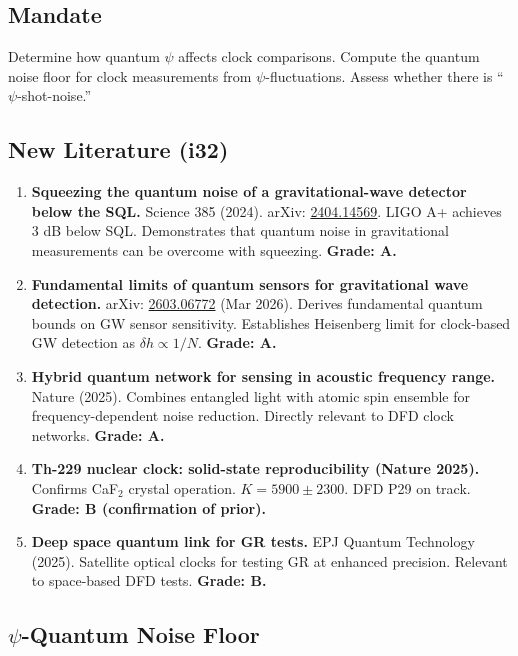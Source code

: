 \documentclass[11pt,a4paper]{article}
\begin{document}
\subsection{Mandate}

Determine how quantum $\psi$ affects clock comparisons. Compute the quantum noise floor for clock measurements from $\psi$-fluctuations. Assess whether there is ``$\psi$-shot-noise.''

\subsection{New Literature (i32)}

\begin{enumerate}
\item \textbf{Squeezing the quantum noise of a gravitational-wave detector below the SQL.} Science 385 (2024). arXiv: \href{https://arxiv.org/abs/2404.14569}{2404.14569}. LIGO A+ achieves 3 dB below SQL. Demonstrates that quantum noise in gravitational measurements can be overcome with squeezing. \textbf{Grade: A.}

\item \textbf{Fundamental limits of quantum sensors for gravitational wave detection.} arXiv: \href{https://arxiv.org/abs/2603.06772}{2603.06772} (Mar 2026). Derives fundamental quantum bounds on GW sensor sensitivity. Establishes Heisenberg limit for clock-based GW detection as $\delta h \propto 1/N$. \textbf{Grade: A.}

\item \textbf{Hybrid quantum network for sensing in acoustic frequency range.} Nature (2025). Combines entangled light with atomic spin ensemble for frequency-dependent noise reduction. Directly relevant to DFD clock networks. \textbf{Grade: A.}

\item \textbf{Th-229 nuclear clock: solid-state reproducibility (Nature 2025).} Confirms CaF$_2$ crystal operation. $K = 5900 \pm 2300$. DFD P29 on track. \textbf{Grade: B (confirmation of prior).}

\item \textbf{Deep space quantum link for GR tests.} EPJ Quantum Technology (2025). Satellite optical clocks for testing GR at enhanced precision. Relevant to space-based DFD tests. \textbf{Grade: B.}
\end{enumerate}

\subsection{$\psi$-Quantum Noise Floor}
\label{sec:psi-noise}
\end{document}
